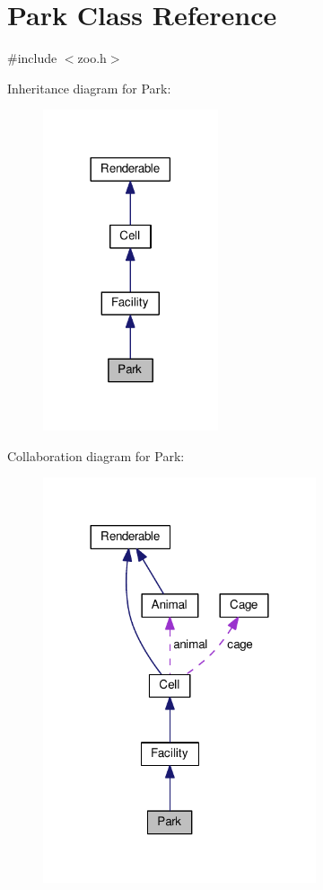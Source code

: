 \hypertarget{classPark}{}\section{Park Class Reference}
\label{classPark}


{\ttfamily \#include $<$zoo.\+h$>$}



Inheritance diagram for Park\+:
\nopagebreak
\begin{figure}[H]
\begin{center}
\leavevmode
\includegraphics[width=146pt]{classPark__inherit__graph}
\end{center}
\end{figure}


Collaboration diagram for Park\+:
\nopagebreak
\begin{figure}[H]
\begin{center}
\leavevmode
\includegraphics[width=228pt]{classPark__coll__graph}
\end{center}
\end{figure}
